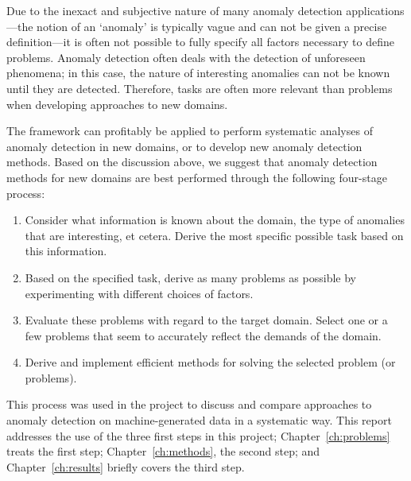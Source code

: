 Due to the inexact and subjective nature of many anomaly detection applications---the notion of an `anomaly' is typically vague and can not be given a precise definition---it is often not possible to fully specify all factors necessary to define problems. Anomaly detection often deals with the detection of unforeseen phenomena; in this case, the nature of interesting anomalies can not be known until they are detected. Therefore, tasks are often more relevant than problems when developing approaches to new domains.

The framework can profitably be applied to perform systematic analyses of anomaly detection in new domains, or to develop new anomaly detection methods. Based on the discussion above, we suggest that anomaly detection methods for new domains are best performed through the following four-stage process:
\begin{enumerate}
  \item Consider what information is known about the domain, the type of anomalies that are interesting, et cetera. Derive the most specific possible task based on this information.
  \item Based on the specified task, derive as many problems as possible by experimenting with different choices of factors.
  \item Evaluate these problems with regard to the target domain. Select one or a few problems that seem to accurately reflect the demands of the domain.
  \item Derive and implement efficient methods for solving the selected problem (or problems).
\end{enumerate}

This process was used in the project to discuss and compare approaches to anomaly detection on machine-generated data in a systematic way. This report addresses the use of the three first steps in this project; Chapter~\ref{ch:problems} treats the first step; Chapter~\ref{ch:methods}, the second step; and Chapter~\ref{ch:results} briefly covers the third step.
